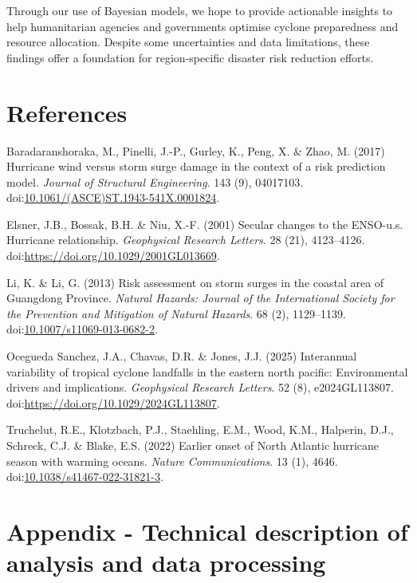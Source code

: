 \documentclass[
]{article}
\newlength{\cslhangindent}
\newenvironment{CSLReferences}[2] %
 {\begin{list}{}{%
  \setlength{\itemindent}{0pt}
  \setlength{\leftmargin}{0pt}
  \setlength{\parsep}{0pt}
  \ifodd #1
   \setlength{\leftmargin}{\cslhangindent}
   \setlength{\itemindent}{-1\cslhangindent}
  \fi
  \setlength{\itemsep}{#2\baselineskip}}}
 {\end{list}}
\begin{document}
Through our use of Bayesian models, we hope to provide actionable insights to help humanitarian agencies and governments optimise cyclone preparedness and resource allocation. Despite some uncertainties and data limitations, these findings offer a foundation for region-specific disaster risk reduction efforts.

\section{References}\label{references}

\label{refs}
\begin{CSLReferences}{0}{1}
Baradaranshoraka, M., Pinelli, J.-P., Gurley, K., Peng, X. \& Zhao, M. (2017) Hurricane wind versus storm surge damage in the context of a risk prediction model. \emph{Journal of Structural Engineering}. 143 (9), 04017103. doi:\href{https://doi.org/10.1061/(ASCE)ST.1943-541X.0001824}{10.1061/(ASCE)ST.1943-541X.0001824}.

Elsner, J.B., Bossak, B.H. \& Niu, X.-F. (2001) Secular changes to the ENSO-u.s. Hurricane relationship. \emph{Geophysical Research Letters}. 28 (21), 4123--4126. doi:\url{https://doi.org/10.1029/2001GL013669}.

Li, K. \& Li, G. (2013) {Risk assessment on storm surges in the coastal area of Guangdong Province}. \emph{Natural Hazards: Journal of the International Society for the Prevention and Mitigation of Natural Hazards}. 68 (2), 1129--1139. doi:\href{https://doi.org/10.1007/s11069-013-0682-2}{10.1007/s11069-013-0682-2}.

Ocegueda Sanchez, J.A., Chavas, D.R. \& Jones, J.J. (2025) Interannual variability of tropical cyclone landfalls in the eastern north pacific: Environmental drivers and implications. \emph{Geophysical Research Letters}. 52 (8), e2024GL113807. doi:\url{https://doi.org/10.1029/2024GL113807}.

Truchelut, R.E., Klotzbach, P.J., Staehling, E.M., Wood, K.M., Halperin, D.J., Schreck, C.J. \& Blake, E.S. (2022) Earlier onset of {North} {Atlantic} hurricane season with warming oceans. \emph{Nature Communications}. 13 (1), 4646. doi:\href{https://doi.org/10.1038/s41467-022-31821-3}{10.1038/s41467-022-31821-3}.

\end{CSLReferences}

\newpage

\section{Appendix - Technical description of analysis and data processing}\label{appendix---technical-description-of-analysis-and-data-processing}
\end{document}

